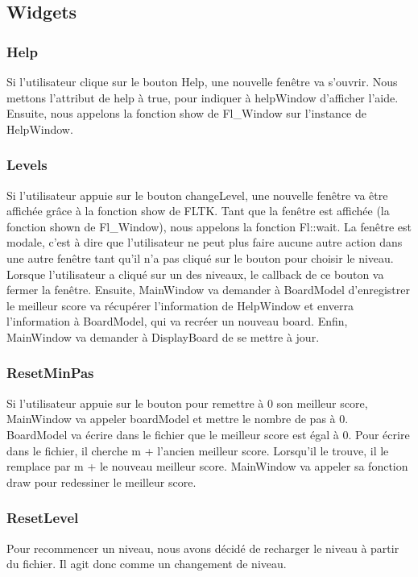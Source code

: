 \documentclass[utf8]{article}
\begin{document}
\begin{large}
\subsection{Widgets}
\subsubsection{Help}
\indent
\par
Si l'utilisateur clique sur le bouton Help, une nouvelle fenêtre va s'ouvrir.
Nous mettons l'attribut de help à true, pour indiquer à helpWindow d'afficher
l'aide. Ensuite, nous appelons la fonction show de Fl\_Window sur l'instance de
HelpWindow.
\par
\subsubsection{Levels}
\indent
\par
Si l'utilisateur appuie sur le bouton changeLevel, une nouvelle fenêtre va être
affichée grâce à la fonction show de FLTK. Tant que la fenêtre est affichée (la
fonction shown de Fl\_Window), nous appelons la fonction Fl::wait. La fenêtre est
modale, c'est à dire que l'utilisateur ne peut plus faire aucune autre action
dans une autre fenêtre tant qu'il n'a pas cliqué sur le bouton pour choisir le
niveau. Lorsque l'utilisateur a cliqué sur un des niveaux, le callback de ce
bouton va fermer la fenêtre. Ensuite, MainWindow va demander à BoardModel
d'enregistrer le meilleur score va récupérer l'information de HelpWindow et
enverra l'information à BoardModel, qui va recréer un nouveau board. Enfin,
MainWindow va demander à DisplayBoard de se mettre à jour.

\par

\subsubsection{ResetMinPas}
\indent
\par
Si l'utilisateur appuie sur le bouton pour remettre à 0 son meilleur score,
MainWindow va appeler boardModel et mettre le nombre de pas à 0. BoardModel va
écrire dans le fichier que le meilleur score est égal à 0. Pour écrire dans le
fichier, il cherche m + l'ancien meilleur score. Lorsqu'il le trouve, il le
remplace par m + le nouveau meilleur score. MainWindow va appeler sa fonction
draw pour redessiner le meilleur score.
\par

\subsubsection{ResetLevel}
Pour recommencer un niveau, nous avons décidé de recharger le niveau à partir du
fichier. Il agit donc comme un changement de niveau.

\end{large}
\end{document}
